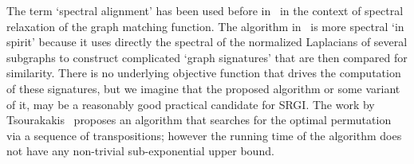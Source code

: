 The term `spectral alignment' has been used before in~\cite{FeiziQMMKJ16} in the context of spectral relaxation of the graph matching function. The algorithm in~\cite{Patrok12} is more spectral `in spirit' because it
uses directly the spectral of the normalized Laplacians of several subgraphs to construct complicated `graph signatures' that are then compared for similarity. There is no underlying objective function that drives 
the computation of these signatures, but we imagine that the proposed algorithm or some variant 
of it, may be a reasonably good practical candidate for SRGI.
The work by Tsourakakis~\cite{Tsourakakis14} proposes an algorithm that searches
for the optimal permutation via a sequence of transpositions; however
the running time of the algorithm does not have any non-trivial sub-exponential
upper bound. 



